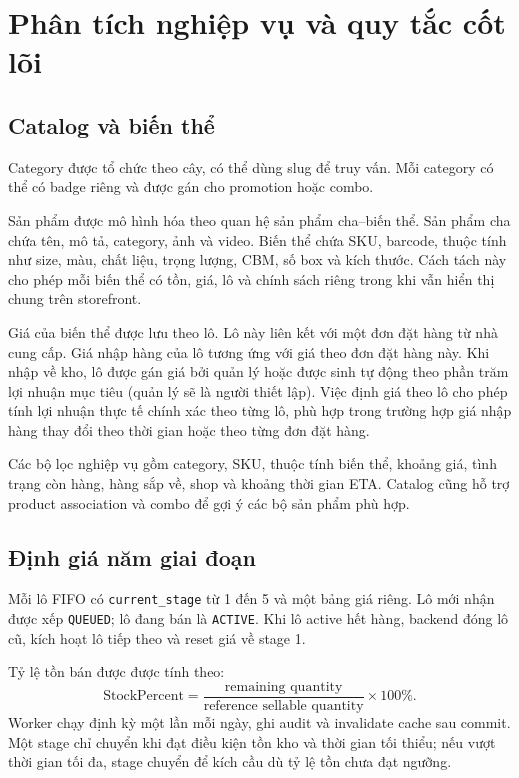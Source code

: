 \documentclass[12pt,a4paper]{report}
\begin{document}
\chapter{Phân tích nghiệp vụ và quy tắc cốt lõi}
\section{Catalog và biến thể}
Category được tổ chức theo cây, có thể dùng slug để truy vấn. Mỗi category có thể có badge riêng và được gán cho promotion hoặc combo.

Sản phẩm được mô hình hóa theo quan hệ sản phẩm cha--biến thể. Sản phẩm cha chứa tên, mô tả, category, ảnh và video. Biến thể chứa SKU, barcode, thuộc tính như size, màu, chất liệu, trọng lượng, CBM, số box và kích thước. Cách tách này cho phép mỗi biến thể có tồn, giá, lô và chính sách riêng trong khi vẫn hiển thị chung trên storefront.

Giá của biến thể được lưu theo lô. Lô này liên kết với một đơn đặt hàng từ nhà cung cấp. Giá nhập hàng của lô tương ứng với giá theo đơn đặt hàng này. Khi nhập về kho, lô được gán giá bởi quản lý hoặc được sinh tự động theo phần trăm lợi nhuận mục tiêu (quản lý sẽ là người thiết lập). Việc định giá theo lô cho phép tính lợi nhuận thực tế chính xác theo từng lô, phù hợp trong trường hợp giá nhập hàng thay đổi theo thời gian hoặc theo từng đơn đặt hàng.

Các bộ lọc nghiệp vụ gồm category, SKU, thuộc tính biến thể, khoảng giá, tình trạng còn hàng, hàng sắp về, shop và khoảng thời gian ETA. Catalog cũng hỗ trợ product association và combo để gợi ý các bộ sản phẩm phù hợp.

\section{Định giá năm giai đoạn}
Mỗi lô FIFO có \texttt{current\_stage} từ 1 đến 5 và một bảng giá riêng. Lô mới nhận được xếp \texttt{QUEUED}; lô đang bán là \texttt{ACTIVE}. Khi lô active hết hàng, backend đóng lô cũ, kích hoạt lô tiếp theo và reset giá về stage 1.

Tỷ lệ tồn bán được được tính theo:
\[
  \text{StockPercent} =
  \frac{\text{remaining quantity}}{\text{reference sellable quantity}}
  \times 100\%.
\]
Worker chạy định kỳ một lần mỗi ngày, ghi audit và invalidate cache sau commit.
Một stage chỉ chuyển khi đạt điều kiện tồn kho và thời gian tối thiểu; nếu vượt thời gian tối đa, stage chuyển để kích cầu dù tỷ lệ tồn chưa đạt ngưỡng. 
\end{document}
